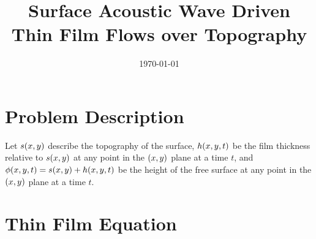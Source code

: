 \documentclass[letterpaper]{article}
\title{Surface Acoustic Wave Driven Thin Film Flows over Topography}
\author{}
\date{\today}
\begin{document}
 
\maketitle

\section{Problem Description}

Let $s\!\left( x, y \right)$ describe the topography of the surface, 
$h\!\left( x,y,t \right)$ be the film thickness relative to $s\!\left( x,y \right)$ at any point in the $\left( x,y \right)$ plane at a time $t$, 
and $\phi\!\left( x,y,t \right) = s\!\left( x,y \right) + h\!\left( x,y,t \right)$ be the height of the free surface at any point in the $\left( x,y \right)$ plane at a time $t$.

\section{Thin Film Equation}

 
\newpage
\printbibliography
\end{document}
